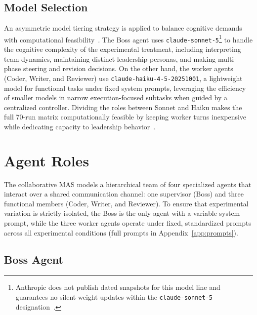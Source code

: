 \subsection{Model Selection}
\label{subsec:model-selection}

An asymmetric model tiering strategy is applied to balance cognitive demands with computational feasibility~\cite{liu2025selectthendecomposeempiricalanalysisadaptive, dang2025multiagentcollaborationevolvingorchestration}.
The Boss agent uses \texttt{claude-sonnet-5}\footnote{Anthropic does not publish dated snapshots for this model line and guarantees no silent weight updates within the \texttt{claude-sonnet-5} designation~\cite{anthropic-sdk-python}.} to handle the cognitive complexity of the experimental treatment, including interpreting team dynamics, maintaining distinct leadership personas, and making multi-phase steering and revision decisions.
On the other hand, the worker agents (Coder, Writer, and Reviewer) use \texttt{claude-haiku-4-5-20251001}, a lightweight model for functional tasks under fixed system prompts, leveraging the efficiency of smaller models in narrow execution-focused subtasks when guided by a centralized controller.
Dividing the roles between Sonnet and Haiku makes the full 70-run matrix computationally feasible by keeping worker turns inexpensive while dedicating capacity to leadership behavior~\cite{zhang2024cutcrapeconomicalcommunication}.

\section{Agent Roles}
\label{sec:agent-roles}

The collaborative \ac{MAS} models a hierarchical team of four specialized agents that interact over a shared communication channel: one supervisor (Boss) and three functional members (Coder, Writer, and Reviewer).
To ensure that experimental variation is strictly isolated, the Boss is the only agent with a variable system prompt, while the three worker agents operate under fixed, standardized prompts across all experimental conditions (full prompts in Appendix~\ref{app:prompts}).

\subsection{Boss Agent}
\label{subsec:boss-agent}

